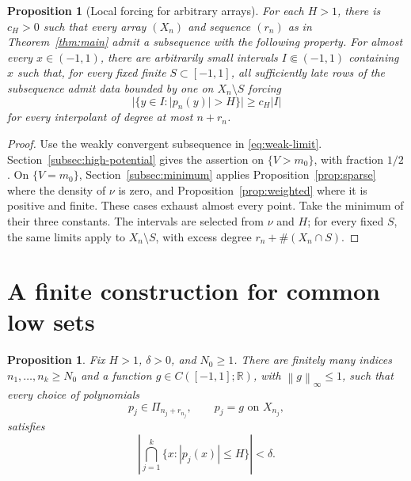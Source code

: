 \documentclass[11pt]{article}
\newtheorem{proposition}[theorem]{Proposition}
\theoremstyle{definition}
\numberwithin{equation}{section}
\newcommand{\R}{\mathbb R}
\newcommand{\norm}[1]{\left\lVert #1\right\rVert}
\begin{document}
\begin{proposition}[Local forcing for arbitrary arrays]\label{prop:local-forcing}
For each \(H>1\), there is \(c_H>0\) such that every array
\((X_n)\) and sequence \((r_n)\) as in Theorem~\ref{thm:main}
admit a subsequence with the following property.
For almost every \(x\in(-1,1)\), there are arbitrarily small
intervals \(I\Subset(-1,1)\) containing \(x\) such that, for every
fixed finite \(S\subset[-1,1]\), all sufficiently late rows of the
subsequence admit data bounded by one on \(X_n\setminus S\) forcing
\[
 |\{y\in I:|p_n(y)|>H\}|\ge c_H|I|
\]
for every interpolant of degree at most \(n+r_n\).
\end{proposition}

\begin{proof}
Use the weakly convergent subsequence in \eqref{eq:weak-limit}.
Section~\ref{subsec:high-potential} gives the assertion on
\(\{V>m_0\}\), with fraction \(1/2\). On \(\{V=m_0\}\),
Section~\ref{subsec:minimum} applies Proposition~\ref{prop:sparse}
where the density of \(\nu\) is zero, and
Proposition~\ref{prop:weighted} where it is positive and finite.
These cases exhaust almost every point. Take the minimum of their
three constants. The intervals are selected from \(\nu\) and \(H\);
for every fixed \(S\), the same limits apply to \(X_n\setminus S\),
with excess degree \(r_n+\#(X_n\cap S)\).
\end{proof}

\section{A finite construction for common low sets}
\label{sec:finite}

\begin{proposition}\label{prop:finite}
Fix \(H>1\), \(\delta>0\), and \(N_0\ge1\).
There are finitely many indices \(n_1,\ldots,n_k\ge N_0\) and
a function \(g\in C([-1,1];\R)\), with \(\norm{g}_\infty\le1\),
such that every choice of polynomials
\[
 p_j\in\Pi_{n_j+r_{n_j}},\qquad p_j=g\text{ on }X_{n_j},
\]
satisfies
\begin{equation}\label{eq:finite-low-set}
 \left|\bigcap_{j=1}^k\{x:|p_j(x)|\le H\}\right|<\delta.
\end{equation}
\end{proposition}
\end{document}
